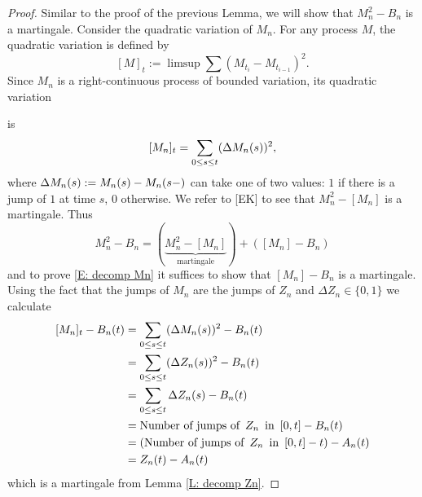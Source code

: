 \begin{proof} \label{P: decomp Mn}
	Similar to the proof of the previous Lemma, we will show that $M_n^2 - B_n$ is a martingale.
	Consider the quadratic variation of $M_n$.
	For any process $M$, the quadratic variation is defined by
	\begin{equation} \label{D: quadratic variation}
	[M]_t := \limsup \sum (M_{t_i} - M_{t_{i-1}})^2.
	\end{equation}
	Since $M_n$ is a right-continuous process of bounded variation, its quadratic variation
	
	is
	\begin{equation} \label{E: quadratic variation Mn}
	[M_n]_{t} = \sum_{0 \leq s \leq t} (\Delta M_n(s))^2,
	\end{equation}
	where
	$\Delta M_n(s) := M_n(s) - M_n(s-)$ 
	can take one of two values: $1$ if there is a jump of $1$ at time $s$, 0 otherwise.
	We refer to [EK] to see that
	$M_n^2 - [M_n]$
	is a martingale.
	Thus
	\begin{equation}
	M_n^2 - B_n = (\underbrace{M_n^2 - [M_n]}_{\text{martingale}}) + ([M_n] - B_n)
	\end{equation}
	and to prove \eqref{E: decomp Mn} it suffices to show that
	$[M_n] - B_n$
	is a martingale.
	Using the fact that the jumps of $M_n$ are the jumps of $Z_n$ and
	$\Delta Z_n \in \lbrace0,1 \rbrace$
	we calculate
	\begin{align*}
	[M_n]_{t} - B_n(t)
	&= \sum_{0 \leq s \leq t} (\Delta M_n(s))^2 - B_n(t) \\
	&= \sum_{0 \leq s \leq t} (\Delta Z_n(s))^2 - B_n(t) \\
	&= \sum_{0 \leq s \leq t} \Delta Z_n(s) - B_n(t) \\
	&= \text{Number of jumps of} \enspace Z_n \enspace \text{in} \enspace [0,t] - B_n(t) \\
	&= (\text{Number of jumps of} \enspace Z_n \enspace \text{in} \enspace [0,t] - t) - A_n(t) \\
	&= Z_n(t) - A_n(t)
	\end{align*}
	which is a martingale from Lemma \ref{L: decomp Zn}.
	
\end{proof}




